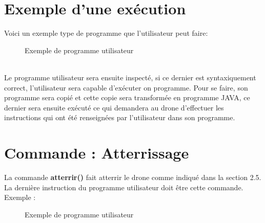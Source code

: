 \documentclass{article}
\begin{document}
\section{Exemple d'une exécution}
    Voici un exemple type de programme que l'utilisateur peut faire: \\
    \begin{figure}[h!]
            \caption{Exemple de programme utilisateur}
            \label{Exemple de programme utilisateur}
    \end{figure}
    \\ Le programme utilisateur sera ensuite inspecté, si ce dernier est syntaxiquement correct, l'utilisateur sera capable d'exécuter on programme. Pour se faire, son programme sera copié et cette copie sera transformée en programme JAVA, ce dernier sera ensuite exécuté ce qui demandera au drone d'effectuer les instructions qui ont été renseignées par l'utilisateur dans son programme.
    
\section{Commande : Atterrissage}
    La commande \textbf{atterrir()} fait atterrir le drone comme indiqué dans la section 2.5. La dernière instruction du programme utilisateur doit être cette commande. \\
    Exemple :
    \begin{figure}[h!]
            \caption{Exemple de programme utilisateur}
            \label{Exemple de la commande atterrir}
    \end{figure}
\end{document}
